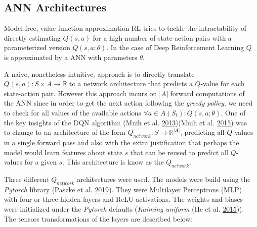 \documentclass[
  openany]{book}
\begin{document}
\hypertarget{ann-architectures}{%
\subsection{ANN Architectures}\label{ann-architectures}}

Model-free, value-function approximation RL tries to tackle the intractability of directly estimating \(Q(s,a)\) for a high number of state-action pairs with a parameterized version \(Q(s,a;\theta)\). In the case of Deep Reinforcement Learning \(Q\) is approximated by a ANN with parameters \(\theta\).

A naive, nonetheless intuitive, approach is to directly translate \(Q(s,a): S \times A \to \mathds{R}\) to a network architecture that predicts a \(Q\)-value for each state-action pair. However this approach incurs on \(|A|\) forward computations of the ANN since in order to get the next action following the \emph{greedy policy}, we need to check for all values of the available actions \(\forall a \in A(S_t): Q(s,a;\theta)\). One of the key insights of the DQN algorithm (Mnih et al. \protect\hyperlink{ref-mnih2013playing}{2013})(Mnih et al. \protect\hyperlink{ref-mnih2015human}{2015}) was to change to an architecture of the form \(Q_{network}: S \to \mathds{R}^{|A|}\), predicting all \(Q\)-values in a single forward pass and also with the extra justification that perhaps the model would learn features about state \(s\) that can be reused to predict all \(Q\)-values for a given \(s\). This architecture is know as the \(Q_{network}\).

Three different \(Q_{network}\) architectures were used. The models were build using the \emph{Pytorch} library (Paszke et al. \protect\hyperlink{ref-NEURIPS2019_9015}{2019}). They were Multilayer Perceptrons (MLP) with four or three hidden layers and ReLU activations. The weights and biases were initialized under the \emph{Pytorch} defaults (\emph{Kaiming uniform} (He et al. \protect\hyperlink{ref-he2015delving}{2015})). The tensors transformations of the layers are described below:
\end{document}
